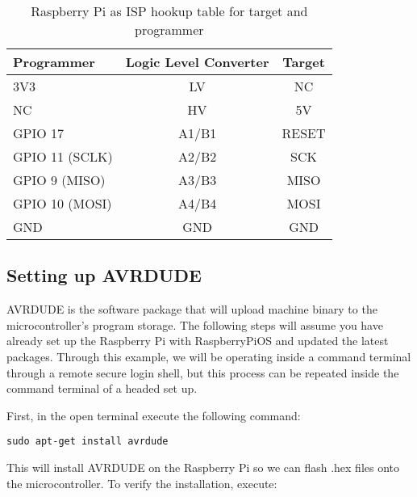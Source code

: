     \begin{table}[h!]
        \caption[RaspberryPi as ISP Hookup Guide]{Raspberry Pi as ISP hookup table for target and programmer}
        \begin{tabular}{ l | c | c }
            \toprule
            Programmer & Logic Level Converter & Target \\
    
            \midrule
            3V3                                 & LV    & NC\footnotemark   \\
            NC\footnotemark[\value{footnote}]   & HV    & 5V                \\
            GPIO 17                             & A1/B1 & RESET             \\
            GPIO 11 (SCLK)                      & A2/B2 & SCK               \\
            GPIO 9 (MISO)                       & A3/B3 & MISO              \\
            GPIO 10 (MOSI)                      & A4/B4 & MOSI              \\
            GND                                 & GND   & GND               \\
    
            \bottomrule
        \end{tabular}
    \end{table}

    \subsection*{Setting up AVRDUDE}
    AVRDUDE is the software package that will upload machine binary to the microcontroller's program storage. 
    The following steps will assume you have already set up the Raspberry Pi with RaspberryPiOS and updated the latest packages. 
    Through this example, we will be operating inside a command terminal through a remote secure login shell, but this process can be repeated inside the command terminal of a headed set up.

    First, in the open terminal execute the following command:

    \begin{lstlisting}[style=kaolstplain,linewidth=1.5\textwidth]
        sudo apt-get install avrdude
    \end{lstlisting}

    This will install AVRDUDE on the Raspberry Pi so we can flash .hex files onto the microcontroller. To verify the installation, execute:

